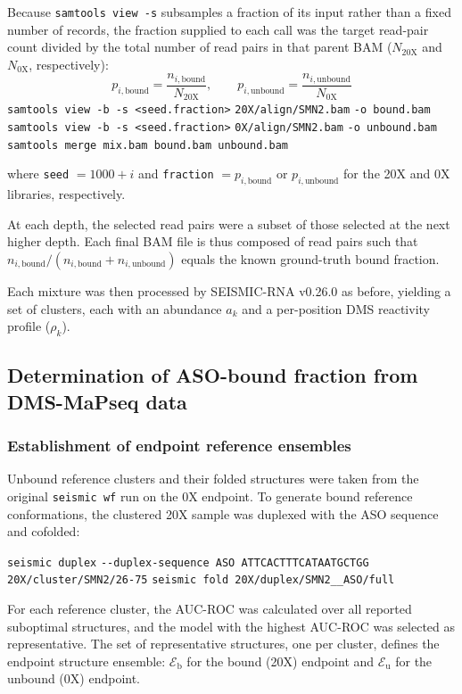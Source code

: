 \documentclass[unnumsec,webpdf,contemporary,large]{oup-authoring-template}%
\theoremstyle{thmstyleone}%
\theoremstyle{thmstyletwo}%
\theoremstyle{thmstylethree}%
\begin{document}
Because \verb|samtools view -s| subsamples a fraction of its input rather than a fixed number of records, the fraction supplied to each call was the target read-pair count divided by the total number of read pairs in that parent BAM ($N_{\mathrm{20X}}$ and $N_{\mathrm{0X}}$, respectively):
\begin{equation}
p_{i,\mathrm{bound}} = \frac{n_{i,\mathrm{bound}}}{N_{\mathrm{20X}}}, \qquad
p_{i,\mathrm{unbound}} = \frac{n_{i,\mathrm{unbound}}}{N_{\mathrm{0X}}}
\end{equation}
\verb|samtools view -b -s <seed.fraction>| \verb|20X/align/SMN2.bam| \verb|-o bound.bam|
\verb|samtools view -b -s <seed.fraction>| \verb|0X/align/SMN2.bam| \verb|-o unbound.bam|
\verb|samtools merge mix.bam bound.bam unbound.bam|

where \verb|seed| $= 1000 + i$ and \verb|fraction| $= p_{i,\mathrm{bound}}$ or $p_{i,\mathrm{unbound}}$ for the 20X and 0X libraries, respectively.

At each depth, the selected read pairs were a subset of those selected at the next higher depth. Each final BAM file is thus composed of read pairs such that $n_{i,\mathrm{bound}} / (n_{i,\mathrm{bound}} + n_{i,\mathrm{unbound}})$ equals the known ground-truth bound fraction.

Each mixture was then processed by SEISMIC-RNA v0.26.0 as before, yielding a set of clusters, each with an abundance $a_k$ and a per-position DMS reactivity profile ($\rho_k$).

\subsection{Determination of ASO-bound fraction from DMS-MaPseq data}

\subsubsection{Establishment of endpoint reference ensembles}
Unbound reference clusters and their folded structures were taken from the original \verb|seismic wf| run on the 0X endpoint. To generate bound reference conformations, the clustered 20X sample was duplexed with the ASO sequence and cofolded:

\verb|seismic duplex| \verb|--duplex-sequence ASO ATTCACTTTCATAATGCTGG| \verb|20X/cluster/SMN2/26-75|
\verb|seismic fold 20X/duplex/SMN2__ASO/full|

For each reference cluster, the AUC-ROC was calculated over all reported suboptimal structures, and the model with the highest AUC-ROC was selected as representative. The set of representative structures, one per cluster, defines the endpoint structure ensemble: $\mathcal{E}_{\mathrm{b}}$ for the bound (20X) endpoint and $\mathcal{E}_{\mathrm{u}}$ for the unbound (0X) endpoint.
\end{document}
